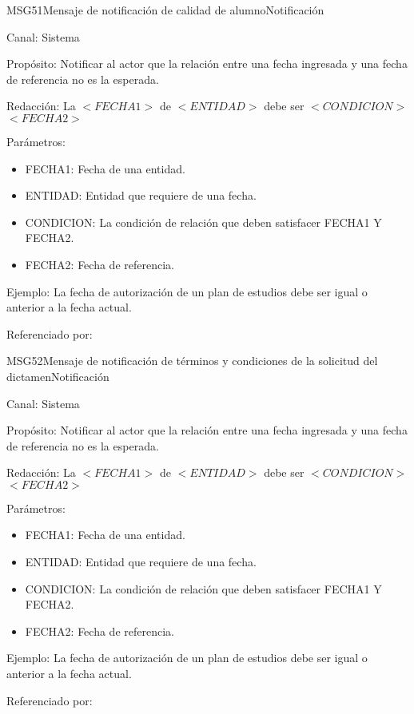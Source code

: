 \begin{mensaje}{MSG51}{Mensaje de notificación de calidad de alumno}{Notificación}
	\item[Canal:] Sistema
	\item[Propósito:] Notificar al actor que la relación entre una fecha ingresada y una fecha de referencia no es la esperada.
	\item[Redacción:] La $<FECHA1>$ de $<ENTIDAD>$ debe ser $<CONDICION>$ $<FECHA2>$
	\item[Parámetros:] 
	\begin{itemize}
		\item FECHA1: Fecha de una entidad.
		\item ENTIDAD: Entidad que requiere de una fecha.
		\item CONDICION: La condición de relación que deben satisfacer FECHA1 Y FECHA2.
		\item FECHA2: Fecha de referencia.
	\end{itemize}
	\item[Ejemplo:] La fecha de autorización de un plan de estudios debe ser igual o anterior a la fecha actual.
	\item[Referenciado por: ] 
\end{mensaje}

\begin{mensaje}{MSG52}{Mensaje de notificación de términos y condiciones de la solicitud del dictamen}{Notificación}
	\item[Canal:] Sistema
	\item[Propósito:] Notificar al actor que la relación entre una fecha ingresada y una fecha de referencia no es la esperada.
	\item[Redacción:] La $<FECHA1>$ de $<ENTIDAD>$ debe ser $<CONDICION>$ $<FECHA2>$
	\item[Parámetros:] 
	\begin{itemize}
		\item FECHA1: Fecha de una entidad.
		\item ENTIDAD: Entidad que requiere de una fecha.
		\item CONDICION: La condición de relación que deben satisfacer FECHA1 Y FECHA2.
		\item FECHA2: Fecha de referencia.
	\end{itemize}
	\item[Ejemplo:] La fecha de autorización de un plan de estudios debe ser igual o anterior a la fecha actual.
	\item[Referenciado por: ] 
\end{mensaje}


